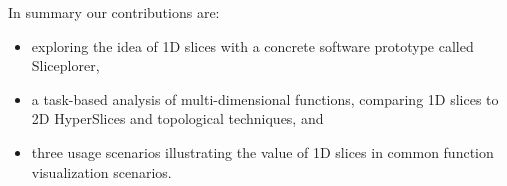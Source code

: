 
In summary our contributions are: 
\begin{itemize}
\item exploring the idea of 1D slices with a concrete software prototype called Sliceplorer,
\item a task-based analysis of multi-dimensional functions, comparing 1D slices to 2D HyperSlices and topological techniques, and
\item %
three usage scenarios illustrating the value of 1D slices in common function 
      visualization scenarios. %
\end{itemize}


